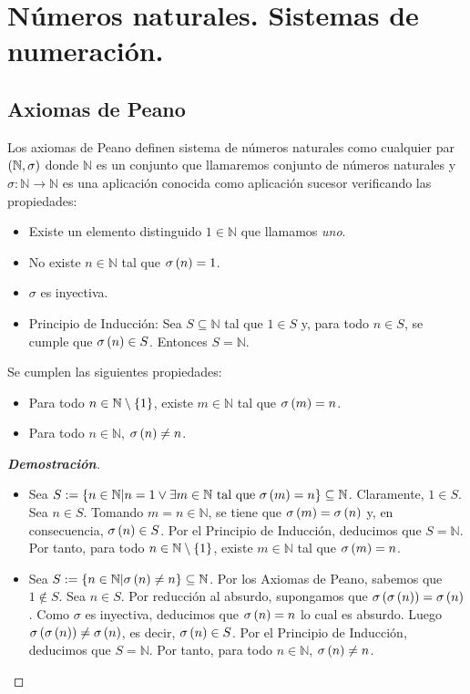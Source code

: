 \chapter{Números naturales. Sistemas de numeración.}
\section{Axiomas de Peano}

Los axiomas de Peano definen sistema de números naturales como cualquier par $\left(\mathbb{N},\sigma\right)$ donde $\mathbb{N}$ es un conjunto que llamaremos conjunto de números naturales y $\sigma:\mathbb{N}\rightarrow\mathbb{N}$ es una aplicación conocida como aplicación sucesor verificando las propiedades:

\begin{itemize}
  \item[1.] Existe un elemento distinguido $1\in\mathbb{N}$ que llamamos \textit{uno}.
  \item[2.] No existe $n\in\mathbb{N}$ tal que $\sigma\left(n\right)=1$.
  \item[3.] $\sigma$ es inyectiva.
  \item[4.] Principio de Inducción: Sea $S\subseteq\mathbb{N}$ tal que $1\in S$ y, para todo $n\in S$, se cumple que $\sigma\left(n\right)\in S$. Entonces $S=\mathbb{N}$. 
\end{itemize}

\begin{proposition}
  \rm Se cumplen las siguientes propiedades:
  \begin{itemize}
    \item[1.] Para todo $n\in\mathbb{N}\setminus\left\{1\right\}$, existe $m\in\mathbb{N}$ tal que $\sigma\left(m\right)=n$.
    \item[2.] Para todo $n\in\mathbb{N}$, $\sigma\left(n\right)\neq n$.
  \end{itemize}
  \begin{proof}[\rm\textbf{Demostración}]
    \hfill
    \begin{itemize}
      \item[1.] Sea $S:=\left\{n\in\mathbb{N}\middle|n=1\lor\exists m\in\mathbb{N}\text{ tal que }\sigma\left(m\right)=n\right\}\subseteq\mathbb{N}$. Claramente, $1\in S$. Sea $n\in S$. Tomando $m=n\in\mathbb{N}$, se tiene que $\sigma\left(m\right)=\sigma\left(n\right)$ y, en consecuencia, $\sigma\left(n\right)\in S$. Por el Principio de Inducción, deducimos que $S=\mathbb{N}$. Por tanto, para todo $n\in\mathbb{N}\setminus\left\{1\right\}$, existe $m\in\mathbb{N}$ tal que $\sigma\left(m\right)=n$.
      \item[2.] Sea $S:=\left\{n\in\mathbb{N}\middle|\sigma\left(n\right)\neq n\right\}\subseteq\mathbb{N}$. Por los Axiomas de Peano, sabemos que $1\notin S$. Sea $n\in S$. Por reducción al absurdo, supongamos que $\sigma\left(\sigma\left(n\right)\right)=\sigma\left(n\right)$. Como $\sigma$ es inyectiva, deducimos que $\sigma\left(n\right)=n$ lo cual es absurdo. Luego $\sigma\left(\sigma\left(n\right)\right)\neq\sigma\left(n\right)$, es decir, $\sigma\left(n\right)\in S$. Por el Principio de Inducción, deducimos que $S=\mathbb{N}$. Por tanto, para todo $n\in\mathbb{N}$, $\sigma\left(n\right)\neq n$.
    \end{itemize}
  \end{proof}
\end{proposition}

